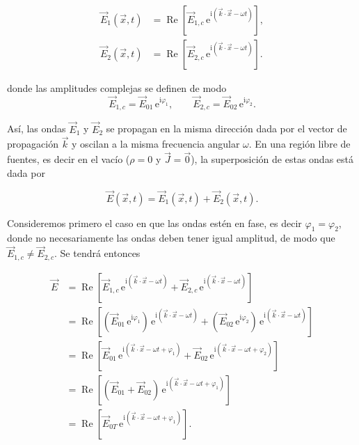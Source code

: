 \documentclass[12pt,a4paper]{article}
\theoremstyle{definition}
\theoremstyle{plain}
\numberwithin{equation}{section}
\theoremstyle{remark}
\newcommand{\ii}{\mathrm{i}}
\newcommand{\ee}{\mathrm{e}}
\begin{document}
\begin{align*}
    \vec E_1(\vec x, t) &=  \operatorname{Re}\left[\vec E_{1,c}\,\ee^{\ii\left(\vec k\cdot\vec x-\omega t\right)}\right] , \\
    \vec E_2(\vec x, t) &=  \operatorname{Re}\left[\vec E_{2,c}\,\ee^{\ii\left(\vec k\cdot\vec x-\omega t\right)}\right] .
\end{align*}

donde las amplitudes complejas se definen de modo
\begin{equation*}
    \vec E_{1,c}=\vec E_{01}\, \ee^{\ii\varphi_1} ,\qquad \vec E_{2,c}=\vec E_{02}\,\ee^{\ii\varphi_2}.
\end{equation*}

Así, las ondas $\vec E_1$ y $\vec E_2$ se propagan en la misma dirección dada por el vector de propagación $\vec k$ y oscilan a la misma frecuencia angular $\omega$. En una región libre de fuentes, es decir en el vacío ($\rho=0$ y $\vec J = \vec 0$), la superposición de estas ondas está dada por

\begin{equation*}
    \vec E(\vec x, t)= \vec E_1(\vec x, t)+ \vec E_2(\vec x, t).
\end{equation*}

Consideremos primero el caso en que las ondas estén en fase, es decir $\varphi_1=\varphi_2$, donde no necesariamente las ondas deben tener igual amplitud, de modo que $\vec E_{1,c}\neq \vec E_{2,c}$. Se tendrá entonces

\begin{align*}
    \vec E &= \operatorname{Re}\left[\vec E_{1,c}\,\ee^{\ii\left(\vec k\cdot\vec x-\omega t\right)}+\vec E_{2,c}\,\ee^{\ii\left(\vec k\cdot\vec x-\omega t\right)}\right] \\
    &= \operatorname{Re}\left[\left(\vec E_{01}\, \ee^{\ii\varphi_1}\right)\,\ee^{\ii\left(\vec k\cdot\vec x-\omega t\right)}+\left(\vec E_{02}\, \ee^{\ii\varphi_2}\right)\,\ee^{\ii\left(\vec k\cdot\vec x-\omega t\right)}\right] \\
    &= \operatorname{Re}\left[\vec E_{01}\,\ee^{\ii\left(\vec k\cdot\vec x-\omega t+\varphi_1\right)}+\vec E_{02}\,\ee^{\ii\left(\vec k\cdot\vec x-\omega t+\varphi_2\right)}\right] \\
    &= \operatorname{Re}\left[\left(\vec E_{01}+\vec E_{02}\right)\,\ee^{\ii\left(\vec k\cdot\vec x-\omega t+\varphi_1\right)}\right] \\
    &= \operatorname{Re}\left[\vec E_{0T}\,\ee^{\ii\left(\vec k\cdot\vec x-\omega t+\varphi_1\right)}\right] .
\end{align*}
\end{document}
